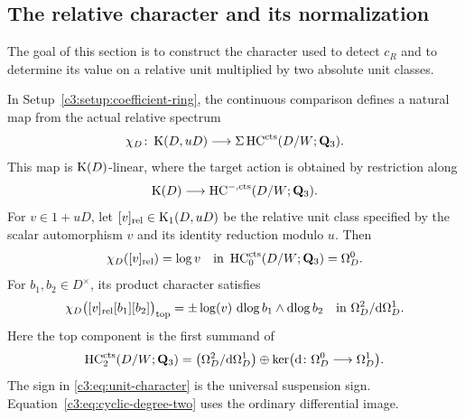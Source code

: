 \subsection{The relative character and its normalization}
\label{c3:sec:character}

The goal of this section is to construct the character used to detect
$c_R$ and to determine its value on a relative unit multiplied by two
absolute unit classes.

\begin{proposition}
\label{c3:prop:relative-character}
In Setup~\ref{c3:setup:coefficient-ring}, the continuous comparison defines
a natural map from the actual relative spectrum
\[
 \chi_D\colon
 \operatorname{K}(D,uD)\longrightarrow
 \Sigma\operatorname{HC}^{\mathrm{cts}}(D/W;\mathbf{Q}_3).
\]
This map is $\operatorname{K}(D)$-linear, where the target action is obtained by
restriction along
\[
 \operatorname{K}(D)\longrightarrow\operatorname{HC}^{-,\mathrm{cts}}(D/W;\mathbf{Q}_3).
\]
For $v\in1+uD$, let $[v]_{\mathrm{rel}}\in\operatorname{K}_1(D,uD)$ be the relative unit
class specified by the scalar automorphism $v$ and its identity
reduction modulo $u$. Then
\[
 \chi_D([v]_{\mathrm{rel}})=\log v
 \quad\text{in }\operatorname{HC}^{\mathrm{cts}}_0(D/W;\mathbf{Q}_3)=\Omega_D^0.
\]
For $b_1,b_2\in D^\times$, its product character satisfies
\begin{equation}\label{c3:eq:unit-character}
 \chi_D\bigl([v]_{\mathrm{rel}}[b_1][b_2]\bigr)_{\mathrm{top}}
   =\pm\log(v)\,\operatorname{dlog} b_1\wedge\operatorname{dlog} b_2
   \quad\text{in }\Omega_D^2/\mathrm{d}\Omega_D^1.
\end{equation}
Here the top component is the first summand of
\begin{equation}\label{c3:eq:cyclic-degree-two}
 \operatorname{HC}^{\mathrm{cts}}_2(D/W;\mathbf{Q}_3)
   =
   \bigl(\Omega_D^2/\mathrm{d}\Omega_D^1\bigr)
   \oplus
   \ker\bigl(\mathrm{d}\colon\Omega_D^0\longrightarrow\Omega_D^1\bigr).
\end{equation}
The sign in \eqref{c3:eq:unit-character} is the universal suspension sign.
Equation~\eqref{c3:eq:cyclic-degree-two} uses the ordinary differential image.
\end{proposition}

